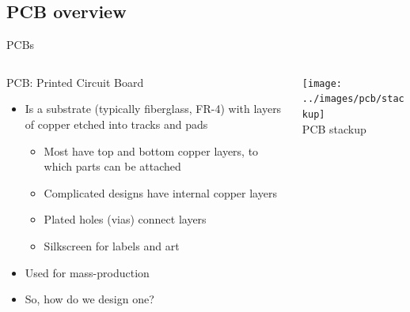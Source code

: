 \documentclass{beamer}
\begin{document}
\subsection{PCB overview}
\begin{frame}{PCBs}
  \begin{columns}[T]
    \begin{column}{.6\textwidth}
      PCB: Printed Circuit Board
      \begin{itemize}
        \item Is a substrate (typically fiberglass, FR-4) with layers of copper etched into tracks and pads
        \begin{itemize}
          \item Most have top and bottom copper layers, to which parts can be attached
          \item Complicated designs have internal copper layers
          \item Plated holes (vias) connect layers
          \item Silkscreen for labels and art
        \end{itemize}
        \item Used for mass-production
        \item So, how do we design one?
      \end{itemize}
    \end{column}

    \begin{column}{0.4\textwidth} \centering
      \texttt{[image: ../images/pcb/stackup]} \\
      PCB stackup
    \end{column}
  \end{columns}
\end{frame}
\end{document}
